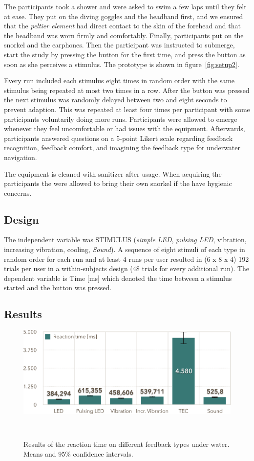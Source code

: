 The participants took a shower and were asked to swim a few laps until they felt at ease. 
They put on the diving goggles and the headband first, and we ensured that the \emph{peltier element} had direct contact to the skin  of the forehead and that the headband was worn firmly and comfortably. 
Finally, participants put on the snorkel and the earphones. 
Then the participant was instructed to submerge, start the study by pressing the button for the first time, and press the button as soon as she perceives a stimulus.
The prototype is shown in figure~\ref{fig:setup2}. 

Every run included each stimulus eight times in random order with the same stimulus being repeated at most two times in a row. After the button was pressed the next stimulus was randomly delayed between two and eight seconds to prevent adaption. 
This was repeated at least four times per participant with some participants voluntarily doing more runs. 
Participants were allowed to emerge whenever they feel uncomfortable or had issues with the equipment. 
Afterwards, participants answered questions on a 5-point Likert scale regarding feedback recognition, feedback comfort, and imagining the feedback type for underwater navigation.

The equipment is cleaned with sanitizer after usage. 
When acquiring the participants the were allowed to bring their own snorkel if the have hygienic concerns. 

\subsection{Design}
The independent variable was STIMULUS (\emph{simple LED}, \emph{pulsing LED}, vibration, increasing vibration, cooling, \emph{Sound}). 
A sequence of eight stimuli of each type in random order for each run and at least 4 runs per user resulted in (6 x 8 x 4) 192 trials per user in a within-subjects design (48 trials for every additional run). 
The dependent variable is Time [ms] which denoted the time between a stimulus started and the button was pressed.

\subsection{Results}

\begin{figure}
	\centering
	\includegraphics[width=\columnwidth]{images/ResultsOfReactionTimes}
	\caption{Results of the reaction time on different feedback types under water. Means and 95\% confidence intervals.}~\label{fig:reactiontimes}
	\vspace{-2em}
\end{figure}

